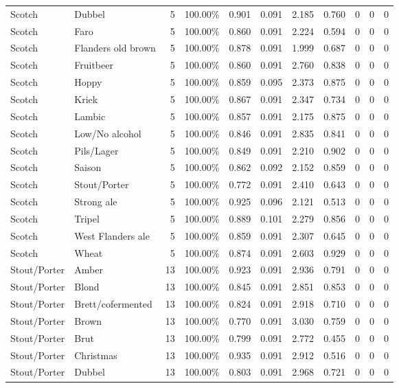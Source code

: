 {\begin{longtable}{llrrrrrrrrr}
Scotch & Dubbel & 5 & 100.00\% & 0.901 & 0.091 & 2.185 & 0.760 & 0 & 0 & 0 \\
Scotch & Faro & 5 & 100.00\% & 0.860 & 0.091 & 2.224 & 0.594 & 0 & 0 & 0 \\
Scotch & Flanders old brown & 5 & 100.00\% & 0.878 & 0.091 & 1.999 & 0.687 & 0 & 0 & 0 \\
Scotch & Fruitbeer & 5 & 100.00\% & 0.860 & 0.091 & 2.760 & 0.838 & 0 & 0 & 0 \\
Scotch & Hoppy & 5 & 100.00\% & 0.859 & 0.095 & 2.373 & 0.875 & 0 & 0 & 0 \\
Scotch & Kriek & 5 & 100.00\% & 0.867 & 0.091 & 2.347 & 0.734 & 0 & 0 & 0 \\
Scotch & Lambic & 5 & 100.00\% & 0.857 & 0.091 & 2.175 & 0.875 & 0 & 0 & 0 \\
Scotch & Low/No alcohol & 5 & 100.00\% & 0.846 & 0.091 & 2.835 & 0.841 & 0 & 0 & 0 \\
Scotch & Pils/Lager & 5 & 100.00\% & 0.849 & 0.091 & 2.210 & 0.902 & 0 & 0 & 0 \\
Scotch & Saison & 5 & 100.00\% & 0.862 & 0.092 & 2.152 & 0.859 & 0 & 0 & 0 \\
Scotch & Stout/Porter & 5 & 100.00\% & 0.772 & 0.091 & 2.410 & 0.643 & 0 & 0 & 0 \\
Scotch & Strong ale & 5 & 100.00\% & 0.925 & 0.096 & 2.121 & 0.513 & 0 & 0 & 0 \\
Scotch & Tripel & 5 & 100.00\% & 0.889 & 0.101 & 2.279 & 0.856 & 0 & 0 & 0 \\
Scotch & West Flanders ale & 5 & 100.00\% & 0.859 & 0.091 & 2.307 & 0.645 & 0 & 0 & 0 \\
Scotch & Wheat & 5 & 100.00\% & 0.874 & 0.091 & 2.603 & 0.929 & 0 & 0 & 0 \\
Stout/Porter & Amber & 13 & 100.00\% & 0.923 & 0.091 & 2.936 & 0.791 & 0 & 0 & 0 \\
Stout/Porter & Blond & 13 & 100.00\% & 0.845 & 0.091 & 2.851 & 0.853 & 0 & 0 & 0 \\
Stout/Porter & Brett/cofermented & 13 & 100.00\% & 0.824 & 0.091 & 2.918 & 0.710 & 0 & 0 & 0 \\
Stout/Porter & Brown & 13 & 100.00\% & 0.770 & 0.091 & 3.030 & 0.759 & 0 & 0 & 0 \\
Stout/Porter & Brut & 13 & 100.00\% & 0.799 & 0.091 & 2.772 & 0.455 & 0 & 0 & 0 \\
Stout/Porter & Christmas & 13 & 100.00\% & 0.935 & 0.091 & 2.912 & 0.516 & 0 & 0 & 0 \\
Stout/Porter & Dubbel & 13 & 100.00\% & 0.803 & 0.091 & 2.968 & 0.721 & 0 & 0 & 0 \\

\end{longtable}}
